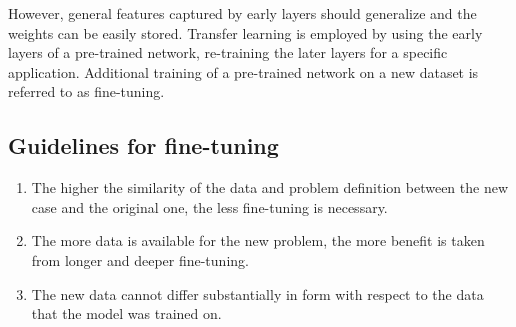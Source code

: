 \documentclass[11pt]{book}
\begin{document}
However, general features captured by early layers should generalize and the weights can be easily stored. Transfer learning is employed by using the early layers of a pre-trained network, re-training the later layers for a specific application. Additional training of a pre-trained network on a new dataset is referred to as fine-tuning. 

\subsection{Guidelines for fine-tuning}

\begin{enumerate}
\item The higher the similarity of the data and problem definition between the new case and the original one, the less fine-tuning is necessary. 

\item The more data is available for the new problem, the more benefit is taken from longer and deeper fine-tuning.

\item The new data cannot differ substantially in form with respect to the data that the model was trained on. 

\end{enumerate}
\end{document}
